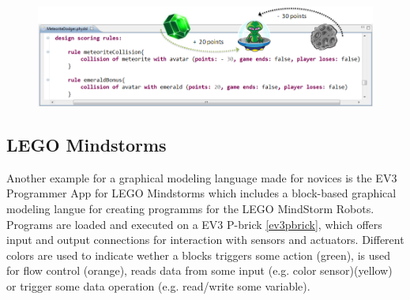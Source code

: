 \documentclass[runningheads,a4paper]{llncs}
\begin{document}
\begin{figure}[H]
      \centering
      \includegraphics[width=\textwidth]{images/PhyDSL4.PNG}
      \label{rulesdef}
    \end{figure}

   \pagebreak
   
   \subsection{LEGO Mindstorms}
   Another example for a graphical modeling language made for novices is the EV3 Programmer App
   for LEGO Mindstorms which includes a block-based graphical modeling langue for creating programms
   for the LEGO MindStorm Robots. Programs are loaded and executed on a EV3 P-brick \ref{ev3pbrick}, 
   which offers input and output connections for interaction with sensors and actuators.
   Different colors are used to indicate wether a blocks triggers some action (green), is used for flow control (orange),
   reads data from some input (e.g. color sensor)(yellow) or trigger some data operation (e.g. read/write some variable).
   
  
\end{document}
